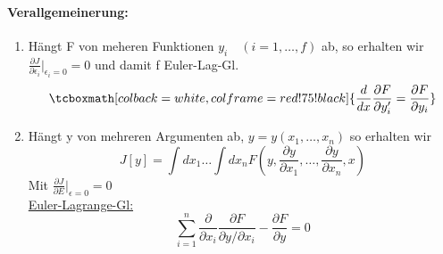 \documentclass[titlepage,12pt,a4paper,ngerman]{report}
\newcommand{\rmbox}[1]{\tcboxmath[colback=white,colframe=red!75!black]{#1}} %
\begin{document}
{\paragraph{Verallgemeinerung:}
\begin{enumerate}[(1)]
	\item Hängt F von meheren Funktionen $ y_i \quad (i=1,\dots ,f) $ ab, so erhalten wir $ \frac{\partial J}{\partial \epsilon_i} \big|_{\epsilon_i = 0} = 0 $ und damit f Euler-Lag-Gl.
	$$\rmbox{\frac{d}{dx} \frac{\partial F}{\partial y'_i} = \frac{\partial F}{\partial y_i}}$$
	\item Hängt y von mehreren Argumenten ab, $ y = y(x_1,\dots,x_n) $ so erhalten wir
	$$ J[y] = \int dx_1 \dots \int dx_n F(y,\frac{\partial y}{\partial x_1} , \dots , \frac{\partial y}{\partial x_n} , x) $$
	Mit $ \frac{\partial J}{\partial E} \bigg| _{\epsilon = 0} = 0 $\\
	\underline{Euler-Lagrange-Gl:}
	$$\sum_{i=1}^{n} \frac{\partial }{\partial x_i} \frac{\partial F}{\partial y / \partial x_i} - \frac{\partial F}{\partial y} = 0$$
\end{enumerate}

}
\end{document}
